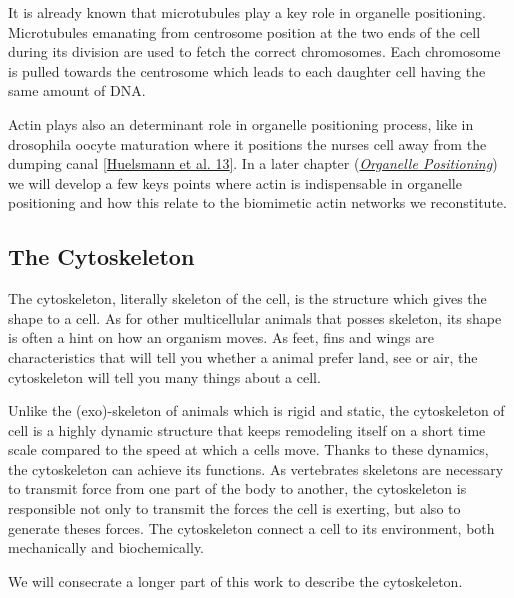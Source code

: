 \documentclass[A4paperpaper,11pt,english]{sphinxmanual}
\begin{document}
It is already known that microtubules play a key role in organelle positioning.
Microtubules emanating from centrosome position at the two ends of the cell
during its division are used to fetch the correct chromosomes. Each
chromosome is pulled towards the centrosome which leads to each daughter
cell having the same amount of DNA.

Actin plays also an determinant role in organelle positioning process,
like in drosophila oocyte maturation where it positions the nurses cell away
from the dumping canal {\hyperref[parts/part1:huelsmann2013]{{[}Huelsmann et al. 13{]}}}. In a later chapter ({\hyperref[parts/part1:organelle-positioning]{\emph{Organelle
Positioning}}}) we will develop a few keys points where
actin is indispensable in organelle positioning and how this relate to the
biomimetic actin networks we reconstitute.


\subsection{The Cytoskeleton}
\label{parts/part1:intro-cyto}\label{parts/part1:the-cytoskeleton}
The cytoskeleton, literally skeleton of the cell, is the structure which gives
the shape to a cell.  As for other multicellular animals that posses
skeleton, its shape is often a hint on how an organism moves. As feet, fins and
wings are characteristics that will tell you whether a animal
prefer land, see or air, the cytoskeleton will tell you many
things about a cell.

Unlike the (exo)-skeleton of animals which is rigid and
static, the cytoskeleton of cell is a  highly dynamic structure that keeps
remodeling itself on a short time scale compared to the speed at which a cells
move. Thanks to these dynamics, the cytoskeleton can achieve its
functions.  As vertebrates skeletons are necessary to transmit force from one part
of the body to another, the cytoskeleton is responsible not only to
transmit the forces the cell is exerting, but also to generate theses forces.
The cytoskeleton connect a cell to its environment,
both mechanically and biochemically.

We will consecrate a longer part of this work to describe the cytoskeleton.
\end{document}
